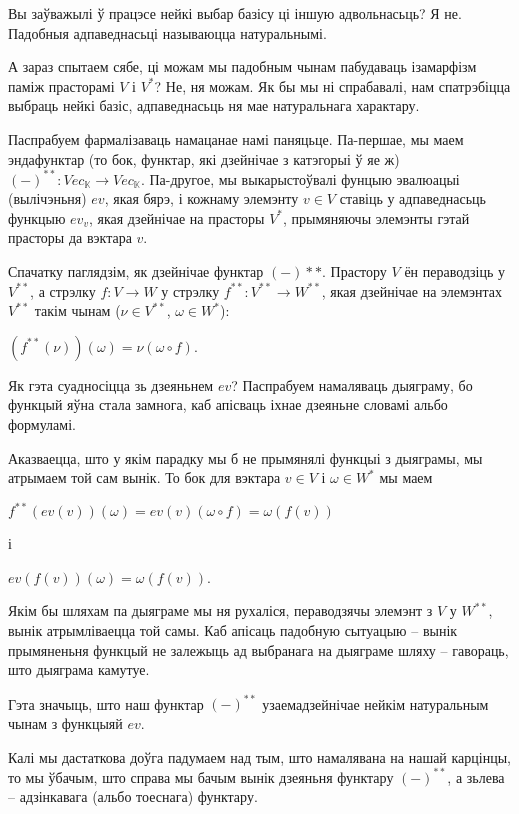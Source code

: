\documentclass[a4paper,12pt]{book}
\begin{document}
Вы заўважылі ў працэсе нейкі выбар базісу ці іншую адвольнасьць? Я
не. Падобныя адпаведнасьці называюцца натуральнымі.

А зараз спытаем сябе, ці можам мы падобным чынам пабудаваць ізамарфізм
паміж прасторамі $V$ і $V^*$? Не, ня можам. Як бы мы ні спрабавалі,
нам спатрэбіцца выбраць нейкі базіс, адпаведнасьць ня мае натуральнага
характару.

Паспрабуем фармалізаваць намацанае намі паняцьце. Па-першае, мы маем
эндафунктар (то бок, функтар, які дзейнічае з катэгорыі ў яе ж)
$(-)^{**}: Vec_{\mathbb{K}} \rightarrow Vec_{\mathbb{K}}$. Па-другое,
мы выкарыстоўвалі фунцыю эвалюацыі (вылічэньня) $ev$,
якая бярэ, і кожнаму элемэнту $v \in V$ ставіць у адпаведнасьць
функцыю $ev_v$, якая дзейнічае на прасторы $V^*$, прымяняючы элемэнты
гэтай прасторы да вэктара $v$.

Спачатку паглядзім, як дзейнічае функтар $(-)**$. Прастору $V$ ён
пераводзіць у $V^{**}$, а стрэлку $f: V \rightarrow W$ у стрэлку
$f^{**}: V^{**} \rightarrow W^{**}$, якая дзейнічае на элемэнтах
$V^{**}$ такім чынам ($\nu \in V^{**}$, $\omega \in W^{*}$):

$(f^{**}(\nu))(\omega) = \nu(\omega \circ f)$.

Як гэта суадносіцца зь дзеяньнем $ev$? Паспрабуем намаляваць дыяграму,
бо функцый яўна стала замнога, каб апісваць іхнае дзеяньне словамі
альбо формуламі.


Аказваецца, што у якім парадку мы б не прымянялі функцыі з дыяграмы,
мы атрымаем той сам вынік. То бок для вэктара $v \in V$ і $\omega \in W^*$ мы маем

$f^{**}(ev(v))(\omega) = ev(v)(\omega \circ f) = \omega(f(v))$

і

$ev(f(v))(\omega) = \omega(f(v))$.

Якім бы шляхам па дыяграме мы ня рухаліся, пераводзячы элемэнт з $V$ у
$W^{**}$, вынік атрымліваецца той самы. Каб апісаць падобную сытуацыю
-- вынік прымяненьня функцый не залежыць ад выбранага на дыяграме
шляху -- гавораць, што дыяграма камутуе.

Гэта значыць, што наш функтар
$(-)^{**}$ узаемадзейнічае нейкім натуральным чынам з функцыяй $ev$.

Калі мы дастаткова доўга падумаем над тым, што намалявана на нашай
карцінцы, то мы ўбачым, што справа мы бачым вынік дзеяньня функтару
$(-)^{**}$, а зьлева -- адзінкавага (альбо тоеснага) функтару.
\end{document}

